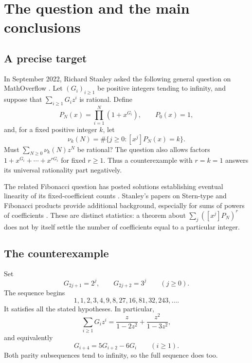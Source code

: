 \documentclass[11pt,letterpaper]{article}
\numberwithin{equation}{section}
\theoremstyle{definition}
\theoremstyle{remark}
\begin{document}
{\small\setlength{\parskip}{0pt}\tableofcontents}
\newpage

\section{The question and the main conclusions}\label{sec:intro}

\subsection{A precise target}
In September 2022, Richard Stanley asked the following general question on MathOverflow \cite{StanleyQuestion}. Let $(G_i)_{i\ge1}$ be positive integers tending to infinity, and suppose that $\sum_{i\ge1}G_i z^i$ is rational. Define
\begin{equation}\label{eq:product}
 P_N(x)=\prod_{i=1}^N(1+x^{G_i}),\qquad P_0(x)=1,
\end{equation}
and, for a fixed positive integer $k$, let
\begin{equation}\label{eq:count}
 \nu_k(N)=\#\{j\ge0:[x^j]P_N(x)=k\}.
\end{equation}
Must $\sum_{N\ge0}\nu_k(N)z^N$ be rational? The question also allows factors $1+x^{G_i}+\cdots+x^{rG_i}$ for fixed $r\ge1$. Thus a counterexample with $r=k=1$ answers its universal rationality part negatively.

The related Fibonacci question has posted solutions establishing eventual linearity of its fixed-coefficient counts \cite{StanleyFibonacci}. Stanley's papers on Stern-type and Fibonacci products provide additional background, especially for sums of powers of coefficients \cite{StanleyStern,StanleyProducts}. These are distinct statistics: a theorem about $\sum_j([x^j]P_N)^r$ does not by itself settle the number of coefficients equal to a particular integer.

\subsection{The counterexample}
Set
\begin{equation}\label{eq:G3}
 G_{2j+1}=2^j,\qquad G_{2j+2}=3^j\qquad(j\ge0).
\end{equation}
The sequence begins
\[
 1,1,2,3,4,9,8,27,16,81,32,243,\ldots.
\]
It satisfies all the stated hypotheses. In particular,
\begin{equation}\label{eq:GGF}
 \sum_{i\ge1}G_i z^i
 =\frac{z}{1-2z^2}+\frac{z^2}{1-3z^2},
\end{equation}
and equivalently
\begin{equation}\label{eq:Grec}
 G_{i+4}=5G_{i+2}-6G_i\qquad(i\ge1).
\end{equation}
Both parity subsequences tend to infinity, so the full sequence does too.
\end{document}

